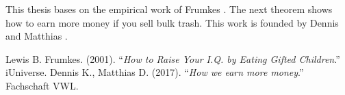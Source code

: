 \documentclass[12pt]{article}
\begin{document}
This thesis bases on the empirical work of Frumkes \citep{brain}. The next theorem shows how to earn more money if you sell bulk trash. This work is founded by Dennis and Matthias \citep{money}.

\begin{thebibliography}{}
 Lewis B. Frumkes. (2001). ``\textit{How to Raise Your I.Q. by Eating Gifted Children}.'' iUniverse.
 Dennis K., Matthias D. (2017). ``\textit{How we earn more money}.'' Fachschaft VWL.
\end{thebibliography}
\end{document}

